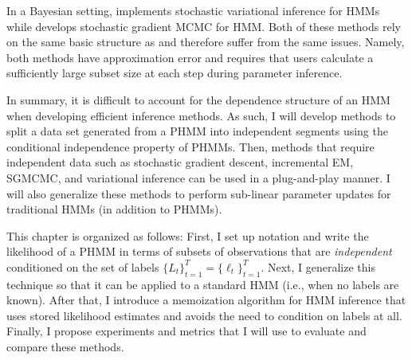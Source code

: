 In a Bayesian setting, \citet{Foti:2014} implements stochastic variational inference for HMMs while \citet{Ma:2017} develops stochastic gradient MCMC for HMM. Both of these methods rely on the same basic structure as \citet{Ye:2017} and therefore suffer from the same issues. Namely, both methods have approximation error and requires that users calculate a sufficiently large subset size at each step during parameter inference.

In summary, it is difficult to account for the dependence structure of an HMM when developing efficient inference methods. As such, I will develop methods to split a data set generated from a PHMM into independent segments using the conditional independence property of PHMMs. Then, methods that require independent data such as stochastic gradient descent, incremental EM, SGMCMC, and variational inference can be used in a plug-and-play manner. I will also generalize these methods to perform sub-linear parameter updates for traditional HMMs (in addition to PHMMs).


This chapter is organized as follows: First, I set up notation and write the likelihood of a PHMM in terms of subsets of observations that are \textit{independent} conditioned on the set of labels $\{L_t\}_{t=1}^T = \{\ell_t\}_{t=1}^T$. Next, I generalize this technique so that it can be applied to a standard HMM (i.e., when no labels are known). After that, I introduce a memoization algorithm for HMM inference that uses stored likelihood estimates and avoids the need to condition on labels at all. Finally, I propose experiments and metrics that I will use to evaluate and compare these methods.